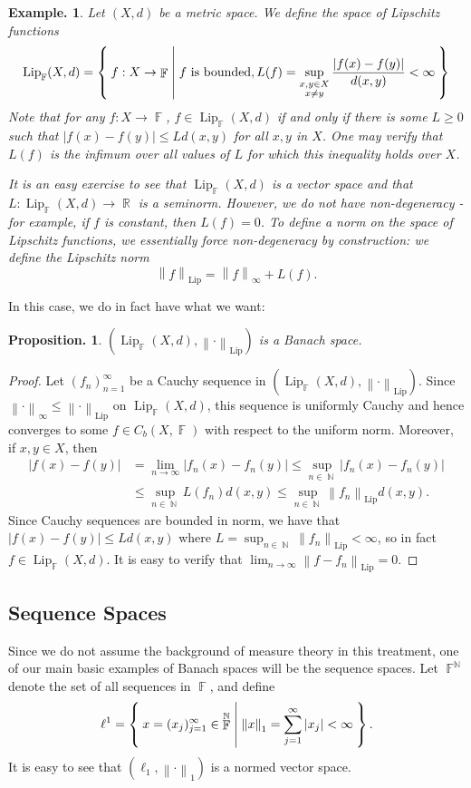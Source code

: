 \documentclass[11pt, a4paper]{memoir}
\DeclareMathOperator{\N}{{\mathbb{N}}}
\DeclareMathOperator{\R}{{\mathbb{R}}}
\DeclareMathOperator{\F}{{\mathbb{F}}}
\newcommand{\norm}[1]{\ensuremath{\left\lVert#1\right\rVert}}
\theoremstyle{change}
\newtheorem{proposition}[theorem]{Proposition.}
\theoremstyle{plain}
\theoremstyle{nonumberplain}
\newtheorem{example}{Example.}
\newtheorem{proof}{Proof}
\newcommand{\Lipspace}{\ensuremath{\operatorname{Lip}_{\F}(X,d)}}
\newcommand{\lp}[1]{\ensuremath{\ell^{#1}}}
\DeclareMathOperator{\Lip}{Lip}
\numberwithin{equation}{section}
\begin{document}
\begin{example}
    Let $(X,d)$ be a metric space.
    We define the space of \textit{Lipschitz functions}
    \begin{equation*}
        \Lipspace=\Set{f:X\to\F | f\text{ is bounded}, L(f)=\sup_{\substack{x,y\in X\\x\neq y}}\frac{|f(x)-f(y)|}{d(x,y)}<\infty}
    \end{equation*}
    Note that for any $f:X\to\F$, $f\in\Lipspace$ if and only if there is some $L\geq 0$ such that $|f(x)-f(y)|\leq Ld(x,y)$ for all $x,y$ in $X$.
    One may verify that $L(f)$ is the infimum over all values of $L$ for which this inequality holds over $X$.

    It is an easy exercise to see that $\Lipspace$ is a vector space and that $L:\Lipspace\to\R$ is a seminorm.
    However, we do not have non-degeneracy - for example, if $f$ is constant, then $L(f)=0$.
    To define a norm on the space of Lipschitz functions, we essentially force non-degeneracy by construction: we define the \textit{Lipschitz norm}
    \begin{equation*}
        \norm{f}_{\Lip}=\norm{f}_\infty+L(f).
    \end{equation*}
\end{example}
In this case, we do in fact have what we want:
\begin{proposition}
    $(\Lipspace,\norm{\cdot}_{\Lip})$ is a Banach space.
\end{proposition}
\begin{proof}
    Let $(f_n)_{n=1}^\infty$ be a Cauchy sequence in $(\Lipspace,\norm{\cdot}_{\Lip})$.
    Since $\norm{\cdot}_\infty\leq\norm{\cdot}_{\Lip}$ on $\Lipspace$, this sequence is uniformly Cauchy and hence converges to some $f\in C_b(X,\F)$ with respect to the uniform norm.
    Moreover, if $x,y\in X$, then
    \begin{align*}
        |f(x)-f(y)| &= \lim_{n\to\infty}|f_n(x)-f_n(y)|\leq \sup_{n\in\N}|f_n(x)-f_n(y)|\\
                    &\leq \sup_{n\in\N} L(f_n)d(x,y)\leq\sup_{n\in\N}\norm{f_n}_{\Lip} d(x,y).
    \end{align*}
    Since Cauchy sequences are bounded in norm, we have that $|f(x)-f(y)|\leq Ld(x,y)$ where $L=\sup_{n\in\N}\norm{f_n}_{\Lip}<\infty$, so in fact $f\in\Lipspace$.
    It is easy to verify that $\lim_{n\to\infty}\norm{f-f_n}_{\Lip}=0$.
\end{proof}
\subsection{Sequence Spaces}
Since we do not assume the background of measure theory in this treatment, one of our main basic examples of Banach spaces will be the sequence spaces.
Let $\F^{\N}$ denote the set of all sequences in $\F$, and define
\begin{equation*}
    \lp{1}=\Set{x=(x_j)_{j=1}^\infty\in\F^{\N} | \norm{x}_1=\sum_{j=1}^\infty|x_j|<\infty}.
\end{equation*}
It is easy to see that $(\ell_1,\norm{\cdot}_1)$ is a normed vector space.
\end{document}
